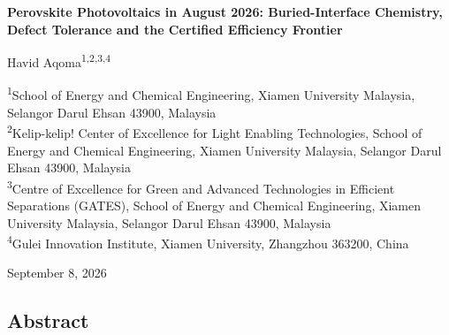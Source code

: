 \documentclass[
  11pt,
]{article}
\author{}
\date{}
\begin{document}
\begin{center}
{\LARGE\bfseries Perovskite Photovoltaics in August 2026: Buried-Interface Chemistry, Defect Tolerance and the Certified Efficiency Frontier\par}
\vspace{1.1em}
{\large Havid Aqoma\textsuperscript{1,2,3,4}\par}
\vspace{0.7em}
\begin{minipage}{\textwidth}\centering\small
\textsuperscript{1}School of Energy and Chemical Engineering, Xiamen University Malaysia, Selangor Darul Ehsan 43900, Malaysia\\[0.25em]
\textsuperscript{2}Kelip-kelip! Center of Excellence for Light Enabling Technologies, School of Energy and Chemical Engineering, Xiamen University Malaysia, Selangor Darul Ehsan 43900, Malaysia\\[0.25em]
\textsuperscript{3}Centre of Excellence for Green and Advanced Technologies in Efficient Separations (GATES), School of Energy and Chemical Engineering, Xiamen University Malaysia, Selangor Darul Ehsan 43900, Malaysia\\[0.25em]
\textsuperscript{4}Gulei Innovation Institute, Xiamen University, Zhangzhou 363200, China\\[0.25em]
\end{minipage}
\vspace{2.2em}
{\small September 8, 2026\par}
\end{center}
\vspace{1.0em}

\subsection{Abstract}\label{abstract}
\end{document}
